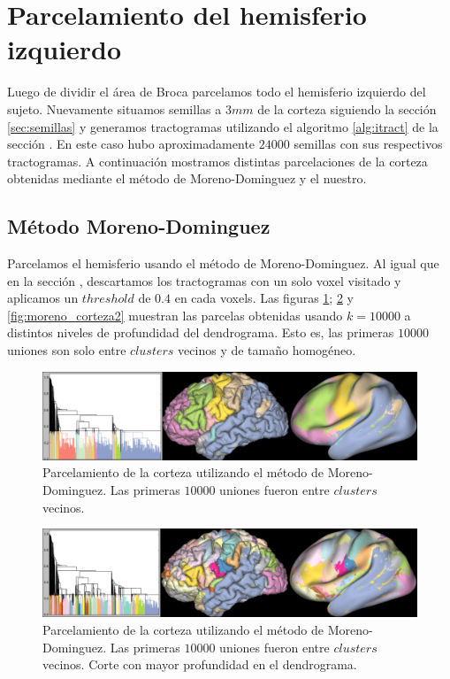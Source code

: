 \section{Parcelamiento del hemisferio izquierdo}

Luego de dividir el \'area de Broca parcelamos todo el hemisferio
izquierdo del sujeto. Nuevamente situamos semillas a $3mm$ de la corteza
siguiendo la secci\'on \ref{sec:semillas} y generamos tractogramas
utilizando el algoritmo \ref{alg:itract} de la secci\'on 
\label{sec:convergencia}. En este caso hubo aproximadamente $24000$
semillas con sus respectivos tractogramas. A continuaci\'on
mostramos distintas parcelaciones de la corteza obtenidas mediante el
m\'etodo de Moreno-Dominguez y el nuestro. 

\subsection{M\'etodo Moreno-Dominguez}
\label{sec:corteza_moreno}

Parcelamos el hemisferio usando el m\'etodo de Moreno-Dominguez. Al igual 
que en la secci\'on \label{sec:clustering_moreno}, descartamos los
tractogramas con un solo voxel visitado y aplicamos un $threshold$ de $0.4$
en cada voxels. Las figuras \ref{fig:moreno_corteza0}; 
\ref{fig:moreno_corteza1} y \ref{fig:moreno_corteza2} muestran las
parcelas obtenidas usando $k=10000$ a distintos niveles de profundidad
del dendrograma. Esto es, las primeras $10000$ uniones son solo entre
$clusters$ vecinos y de tama\~no homog\'eneo. 

\begin{figure}[h!]
    \includegraphics[width=\textwidth]{img/all_brain/moreno_10000.png}
    \caption{Parcelamiento de la corteza utilizando el m\'etodo de 
             Moreno-Dominguez. Las primeras $10000$ uniones fueron entre
             $clusters$ vecinos.}
    \label{fig:moreno_corteza0}
\end{figure}

\begin{figure}[h!]
    \includegraphics[width=\textwidth]{img/all_brain/moreno_10000_deep0.png}
    \caption{Parcelamiento de la corteza utilizando el m\'etodo de 
             Moreno-Dominguez. Las primeras $10000$ uniones fueron entre
             $clusters$ vecinos. Corte con mayor profundidad en el 
             dendrograma.}
    \label{fig:moreno_corteza1}
\end{figure}

